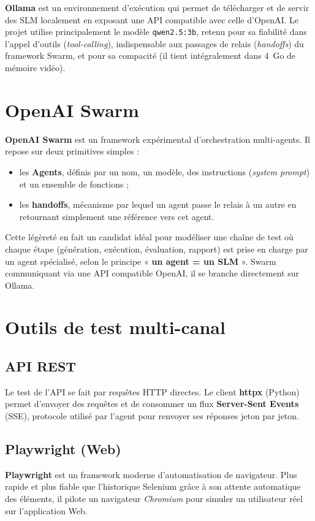 \documentclass[12pt,a4paper,oneside]{report}
\begin{document}
\textbf{Ollama} est un environnement d'exécution qui permet de télécharger et de servir
des SLM localement en exposant une API compatible avec celle d'OpenAI. Le projet
utilise principalement le modèle \texttt{qwen2.5:3b}, retenu pour sa fiabilité dans
l'appel d'outils (\textit{tool-calling}), indispensable aux passages de relais
(\textit{handoffs}) du framework Swarm, et pour sa compacité (il tient intégralement
dans 4~Go de mémoire vidéo).

\section{OpenAI Swarm}
\textbf{OpenAI Swarm} est un framework expérimental d'orchestration multi-agents. Il
repose sur deux primitives simples :
\begin{itemize}[leftmargin=*]
  \item les \textbf{Agents}, définis par un nom, un modèle, des instructions
  (\textit{system prompt}) et un ensemble de fonctions ;
  \item les \textbf{handoffs}, mécanisme par lequel un agent passe le relais à un autre
  en retournant simplement une référence vers cet agent.
\end{itemize}
Cette légèreté en fait un candidat idéal pour modéliser une chaîne de test où chaque
étape (génération, exécution, évaluation, rapport) est prise en charge par un agent
spécialisé, selon le principe « \textbf{un agent = un SLM} ». Swarm communiquant via
une API compatible OpenAI, il se branche directement sur Ollama.

\section{Outils de test multi-canal}
\subsection{API REST}
Le test de l'API se fait par requêtes HTTP directes. Le client \textbf{httpx} (Python)
permet d'envoyer des requêtes et de consommer un flux \textbf{Server-Sent Events}
(SSE), protocole utilisé par l'agent pour renvoyer ses réponses jeton par jeton.

\subsection{Playwright (Web)}
\textbf{Playwright} est un framework moderne d'automatisation de navigateur. Plus
rapide et plus fiable que l'historique Selenium grâce à son attente automatique des
éléments, il pilote un navigateur \textit{Chromium} pour simuler un utilisateur réel
sur l'application Web.
\end{document}
